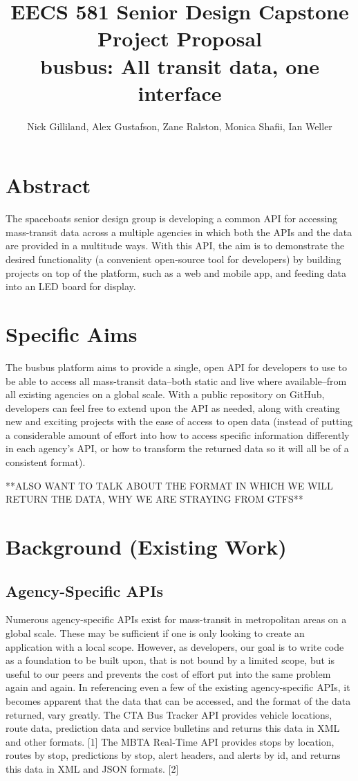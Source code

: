 \documentclass[12pt]{article}
\title{EECS 581 Senior Design Capstone Project Proposal \\
busbus: All transit data, one interface}
\author{Nick Gilliland, Alex Gustafson, Zane Ralston, Monica Shafii, Ian Weller}
\begin{document}
\maketitle

\section{Abstract}

The spaceboats senior design group is developing a common API for accessing mass-transit data
across a multiple agencies in which both the APIs and the data are provided in a multitude ways. 
With this API, the aim is to demonstrate the desired functionality (a convenient open-source tool 
for developers) by building projects on top of the platform, such as a web and mobile app, and 
feeding data into an LED board for display.

\section{Specific Aims}

The busbus platform aims to provide a single, open API for developers to use to be able to access all
mass-transit data--both static and live where available--from all existing agencies on a global scale. 
With a public repository on GitHub, developers can feel free to extend upon the API as needed,
along with creating new and exciting projects with the ease of access to open data (instead of 
putting a considerable amount of effort into how to access specific information differently in each 
agency's API, or how to transform the returned data so it will all be of a consistent format).

**ALSO WANT TO TALK ABOUT THE FORMAT IN WHICH WE WILL RETURN THE DATA, WHY WE
ARE STRAYING FROM GTFS**

\section{Background (Existing Work)}
\subsection{Agency-Specific APIs}

Numerous agency-specific APIs exist for mass-transit in metropolitan areas on a global scale.
These may be sufficient if one is only looking to create an application with a local scope. However,
as developers, our goal is to write code as a foundation to be built upon, that is not bound by a
limited scope, but is useful to our peers and prevents the cost of effort put into the same 
problem again and again. In referencing even a few of the existing agency-specific APIs, it
becomes apparent that the data that can be accessed, and the format of the data returned, 
vary greatly. The CTA Bus Tracker API provides vehicle locations, route data, prediction data and 
service bulletins and returns this data in XML and other formats. [1] The MBTA Real-Time API provides 
stops by location, routes by stop, predictions by stop, alert headers, and alerts by id, and returns 
this data in XML and JSON formats. [2] 
\end{document}
